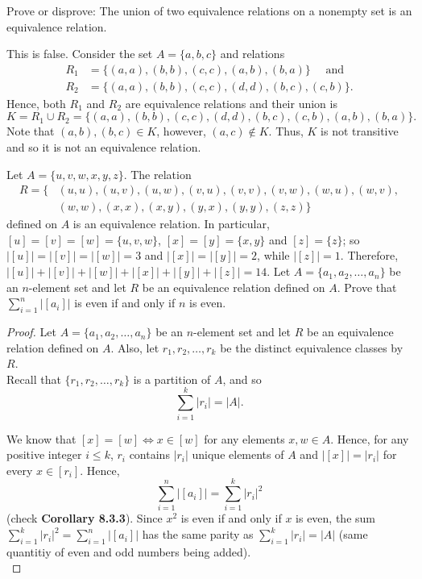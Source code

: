 \documentclass[12pt]{article}
\newenvironment{problem}[2][Problem]{\begin{trivlist}
		\item[\hskip \labelsep {\bfseries #1}\hskip \labelsep {\bfseries #2.}]}{\end{trivlist}}
\newenvironment{solution}[2][Solution]{\begin{trivlist}
		\item[\hskip \labelsep {\bfseries #1}\hskip \labelsep {\bfseries #2.}]}{\end{trivlist}}
\begin{document}
 	\begin{problem}{42}
 		Prove or disprove: The union of two equivalence relations on a nonempty set is an equivalence relation.
 		\begin{solution}{42}
 			This is false. Consider the set $A=\{a,b,c\}$ and relations 
 			\begin{align*}
 			R_{1} &= \{(a,a),(b,b),(c,c),(a,b),(b,a)\}\quad \text{ and}\\ R_{2} &= \{(a,a),(b,b),(c,c),(d,d),(b,c),(c,b)\}.
 			\end{align*}
 			Hence, both $R_{1}$ and $R_{2}$ are equivalence relations and their union is 
 			\begin{equation*}
 			K=R_{1}\cup R_{2} = \{(a,a),(b,b),(c,c),(d,d),(b,c),(c,b),(a,b),(b,a)\}.
 			\end{equation*}
 			Note that $(a,b),(b,c)\in K$, however, $(a,c)\not\in K$. Thus, $K$ is not transitive and so it is not an equivalence relation.
 		\end{solution}
 	\end{problem}
 
 	\begin{problem}{43}
 		Let $A=\{u,v,w,x,y,z\}$. The relation
 		\begin{align*}
 			R=\{&(u,u),(u,v),(u,w),(v,u),(v,v),(v,w),(w,u),(w,v),\\
 			&(w,w),(x,x),(x,y),(y,x),(y,y),(z,z)\}
 		\end{align*}
 		defined on $A$ is an equivalence relation. In particular, $[u]=[v]=[w]=\{u,v,w\}$, $[x]=[y]=\{x,y\}$ and $[z]=\{z\}$; so $|[u]|=|[v]|=|[w]|=3$ and $|[x]|=|[y]|=2$, while $|[z]|=1$. Therefore, $|[u]|+|[v]|+|[w]|+|[x]|+|[y]|+|[z]|=14$. Let $A=\{a_{1},a_{2},\ldots,a_{n}\}$ be an $n$-element set and let $R$ be an equivalence relation defined on $A$. Prove that $\sum_{i=1}^{n}|[a_{i}]|$ is even if and only if $n$ is even.
 		\begin{proof}
 		Let $A=\{a_{1},a_{2},\ldots,a_{n}\}$ be an $n$-element set and let $R$ be an equivalence relation defined on $A$. Also, let $r_{1},r_{2},\ldots,r_{k}$ be the distinct equivalence classes by $R$.\\
 		
 		 Recall that $\{r_{1},r_{2},\ldots,r_{k}\}$ is a partition of $A$, and so
 		 \begin{equation*}
 		  \sum_{i=1}^{k}|r_{i}| = |A|.
 		  \end{equation*}
 			  
 		We know that $[x] = [w] \iff x\in [w]$ for any elements $x,w\in A$. Hence, for any positive integer $i\leq k$, $r_{i}$ contains $|r_{i}|$ unique elements of $A$ and  $|[x]|=|r_{i}|$ for every $x\in [r_{i}]$. Hence,  
 		\begin{equation*}
 		 \sum_{i=1}^{n}|[a_{i}]| = \sum_{i=1}^{k}|r_{i}|^{2}
 		 \end{equation*}
 		  (check \textbf{Corollary 8.3.3}). 	Since $x^{2}$ is even if and only if $x$ is even, the sum $\sum_{i=1}^{k}|r_{i}|^{2}=\sum_{i=1}^{n}|[a_{i}]|$ has the same parity as $\sum_{i=1}^{k}|r_{i}| = |A|$ (same quantitiy of even and odd numbers being added).\\
 		\end{proof}
 	\end{problem}
\end{document}
